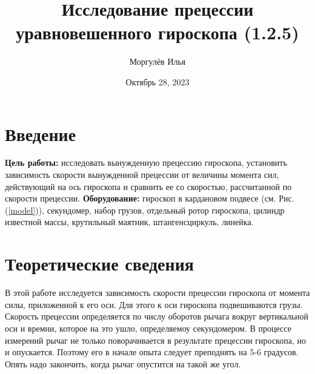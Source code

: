 \documentclass[a4paper, 12pt]{article}
\title{\textbf{Исследование прецессии уравновешенного гироскопа (1.2.5)}}
\author{Моргулёв Илья}
\date{Октябрь 28, 2023}
\begin{document}
    \maketitle

    \section{Введение}
	
	\textbf{Цель работы:} исследовать вынужденную прецессию гироскопа, установить зависимость скорости вынужденной прецессии от величины момента сил, действующий на ось гироскопа и сравнить ее со скоростью, рассчитанной по скорости прецессии.\newline
	\textbf{Оборудование:} гироскоп в кардановом подвесе (см. Рис. (\ref{model})), секундомер, набор грузов, отдельный ротор гироскопа, цилиндр известной массы, крутильный маятник, штангенсциркуль, линейка.
	
	\section{Теоретические сведения}
	
	В этой работе исследуется зависимость скорости прецессии гироскопа от момента силы, приложенной к его оси. Для этого к оси гироскопа подвешиваются грузы. Скорость прецессии определяется по числу оборотов рычага вокруг вертикальной оси и времни, которое на это ушло, определяемоу секундомером. В процессе измерений рычаг не только поворачивается в результате прецессии гироскопа, но и опускается. Поэтому его в начале опыта следует преподнять на 5-6 градусов.  Опять надо закончить, когда рычаг опустится на такой же угол.\newline
\end{document}
